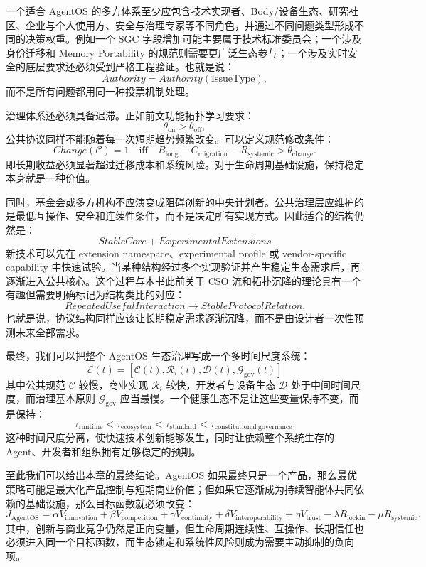 一个适合 AgentOS 的多方体系至少应包含技术实现者、Body/设备生态、研究社区、企业与个人使用方、安全与治理专家等不同角色，并通过不同问题类型形成不同的决策权重。例如一个 SGC 字段增加可能主要属于技术标准委员会；一个涉及身份迁移和 Memory Portability 的规范则需要更广泛生态参与；一个涉及实时安全的底层要求还必须受到严格工程验证。也就是说：
\[
Authority
=
Authority(\text{IssueType}),
\]
而不是所有问题都用同一种投票机制处理。

治理体系还必须具备迟滞。正如前文功能拓扑学习要求：
\[
\theta_{\mathrm{on}}
>
\theta_{\mathrm{off}},
\]
公共协议同样不能随着每一次短期趋势频繁改变。可以定义规范修改条件：
\[
Change(\mathcal C)
=
1
\quad
\text{iff}
\quad
B_{\mathrm{long}}
-
C_{\mathrm{migration}}
-
R_{\mathrm{systemic}}
>
\theta_{\mathrm{change}}.
\]
即长期收益必须显著超过迁移成本和系统风险。对于生命周期基础设施，保持稳定本身就是一种价值。

同时，基金会或多方机构不应演变成阻碍创新的中央计划者。公共治理层应维护的是最低互操作、安全和连续性条件，而不是决定所有实现方式。因此适合的结构仍然是：
\[
\boxed{
StableCore
+
ExperimentalExtensions
}
\]
新技术可以先在 extension namespace、experimental profile 或 vendor-specific capability 中快速试验。当某种结构经过多个实现验证并产生稳定生态需求后，再逐渐进入公共核心。这个过程与本书此前关于 CSO 流和拓扑沉降的理论具有一个有趣但需要明确标记为结构类比的对应：
\[
RepeatedUsefulInteraction
\rightarrow
StableProtocolRelation.
\]
也就是说，协议结构同样应该让长期稳定需求逐渐沉降，而不是由设计者一次性预测未来全部需求。

最终，我们可以把整个 AgentOS 生态治理写成一个多时间尺度系统：
\[
\boxed{
\mathcal E(t)
=
[
\mathcal C(t),
\mathcal R_i(t),
\mathcal D(t),
\mathcal G_{\mathrm{gov}}(t)
]
}
\]
其中公共规范 $\mathcal C$ 较慢，商业实现 $\mathcal R_i$ 较快，开发者与设备生态 $\mathcal D$ 处于中间时间尺度，而治理基本原则 $\mathcal G_{\mathrm{gov}}$ 应当最慢。一个健康生态不是让这些变量保持不变，而是保持：
\[
\tau_{\mathrm{runtime}}
<
\tau_{\mathrm{ecosystem}}
<
\tau_{\mathrm{standard}}
<
\tau_{\mathrm{constitutional\ governance}}.
\]
这种时间尺度分离，使快速技术创新能够发生，同时让依赖整个系统生存的 Agent、开发者和组织拥有足够稳定的预期。

至此我们可以给出本章的最终结论。AgentOS 如果最终只是一个产品，那么最优策略可能是最大化产品控制与短期商业价值；但如果它逐渐成为持续智能体共同依赖的基础设施，那么目标函数就必须改变：
\[
\boxed{
J_{\mathrm{AgentOS}}
=
\alpha V_{\mathrm{innovation}}
+
\beta V_{\mathrm{competition}}
+
\gamma V_{\mathrm{continuity}}
+
\delta V_{\mathrm{interoperability}}
+
\eta V_{\mathrm{trust}}
-
\lambda R_{\mathrm{lockin}}
-
\mu R_{\mathrm{systemic}}.
}
\]
其中，创新与商业竞争仍然是正向变量，但生命周期连续性、互操作、长期信任也必须进入同一个目标函数，而生态锁定和系统性风险则成为需要主动抑制的负向项。

